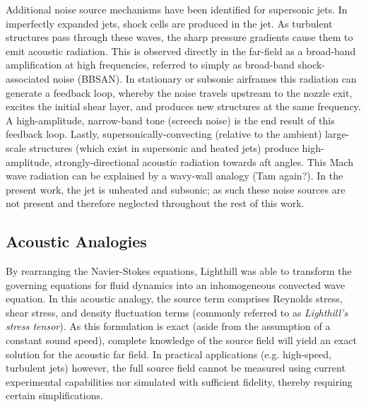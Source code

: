 Additional noise source mechanisms have been identified for supersonic jets. In imperfectly expanded jets, shock cells are produced in the jet. As turbulent structures pass through these waves, the sharp pressure gradients cause them to emit acoustic radiation. 
This is observed directly in the far-field as a broad-band amplification at high frequencies, referred to simply as broad-band shock-associated noise (BBSAN). 
In stationary or subsonic airframes this radiation can generate a feedback loop, whereby the noise travels upstream to the nozzle exit, excites the initial shear layer, and produces new structures at the same frequency.
A high-amplitude, narrow-band tone (screech noise) is the end result of this feedback loop.
Lastly, supersonically-convecting (relative to the ambient) large-scale structures (which exist in supersonic and heated jets) produce high-amplitude, strongly-directional acoustic radiation towards aft angles.
This Mach wave radiation can be explained by a wavy-wall analogy (Tam again?).
In the present work, the jet is unheated and subsonic; as such these noise sources are not present and therefore neglected throughout the rest of this work.

\subsection{Acoustic Analogies}
By rearranging the Navier-Stokes equations, Lighthill \citep{Lighthill1952} was able to transform the governing equations for fluid dynamics into an inhomogeneous convected wave equation. 
In this acoustic analogy, the source term comprises Reynolds stress, shear stress, and density fluctuation terms (commonly referred to as \emph{Lighthill's stress tensor}).
As this formulation is exact (aside from the assumption of a constant sound speed), complete knowledge of the source field will yield an exact solution for the acoustic far field.
In practical applications (e.g. high-speed, turbulent jets) however, the full source field cannot be measured using current experimental capabilities nor simulated with sufficient fidelity, thereby requiring certain simplifications.

